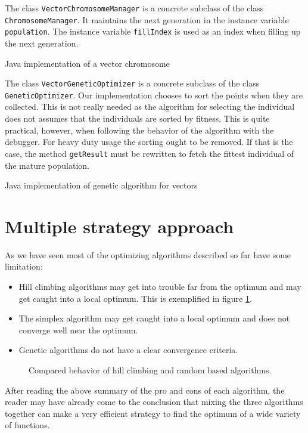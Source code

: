 \documentclass[twoside]{book}
\begin{document}
The class {\tt VectorChromosomeManager} is a concrete subclass of
the class {\tt ChromosomeManager}. It maintains the next
generation in the instance variable {\tt population}. The instance
variable {\tt fillIndex} is used as an index when filling up the
next generation.

\begin{listing} Java implementation of a vector chromosome
\label{lj:vectorchromosome}

\end{listing}
The class {\tt VectorGeneticOptimizer} is a concrete subclass of
the class {\tt GeneticOptimizer}. Our implementation chooses to
sort the points when they are collected. This is not really needed
as the algorithm for selecting the individual does not assumes
that the individuals are sorted by fitness. This is quite
practical, however, when following the behavior of the algorithm
with the debugger. For heavy duty usage the sorting ought to be
removed. If that is the case, the method {\tt getResult} must be
rewritten to fetch the fittest individual of the mature
population.
\begin{listing} Java implementation of genetic algorithm for vectors
\label{lj:optimizervector}

\end{listing}

\section{Multiple strategy approach}
\label{sec:multistrategy} As we have seen most of the optimizing
algorithms described so far have some limitation:
\begin{itemize}
  \item Hill climbing algorithms may get into trouble far from the
  optimum and may get caught into a local optimum. This is exemplified in figure \ref{fig:hillvsrandom}.
  \item The simplex algorithm may get caught into a local optimum
  and does not converge well near the optimum.
  \item Genetic algorithms do not have a clear convergence
  criteria.
\end{itemize}
\begin{figure}
\center{} \caption{Compared behavior of hill climbing and random
based algorithms.}\label{fig:hillvsrandom}
\end{figure}
After reading the above summary of the pro and cons of each
algorithm, the reader may have already come to the conclusion that
mixing the three algorithms together can make a very efficient
strategy to find the optimum of a wide variety of functions.
\end{document}
